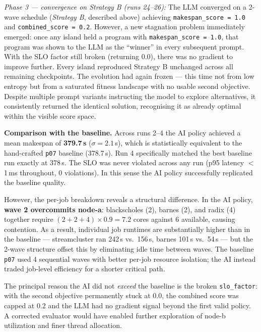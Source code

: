 \begin{enumerate}
\begin{enumerate}
\textit{Phase 3 --- convergence on Strategy B (runs 24--26):} The LLM converged on a 2-wave schedule (\emph{Strategy B}, described above) achieving \texttt{makespan\_score = 1.0} and \texttt{combined\_score = 0.2}. However, a new stagnation problem immediately emerged: once any island held a program with \texttt{makespan\_score = 1.0}, that program was shown to the LLM as the ``winner'' in every subsequent prompt. With the SLO factor still broken (returning 0.0), there was no gradient to improve further. Every island reproduced Strategy B unchanged across all remaining checkpoints. The evolution had again frozen --- this time not from low entropy but from a saturated fitness landscape with no usable second objective. Despite multiple prompt variants instructing the model to explore alternatives, it consistently returned the identical solution, recognising it as already optimal within the visible score space.

\medskip
\noindent\textbf{Comparison with the baseline.} \label{sec:ai_comparison}
Across runs 2--4 the AI policy achieved a mean makespan of \textbf{379.7\,s} ($\sigma = 2.1$\,s), which is statistically equivalent to the hand-crafted \texttt{p07} baseline (378.7\,s). Run 4 specifically matched the best baseline run exactly at 378\,s. The SLO was never violated across any run (p95 latency $<$ 1\,ms throughout, 0 violations). In this sense the AI policy successfully replicated the baseline quality.

However, the per-job breakdown reveals a structural difference. In the AI policy, \textbf{wave 2 overcommits node-a}: blackscholes (2), barnes (2), and radix (4) together require $(2+2+4)\times 0.9 = 7.2$ cores against 6 available, causing contention. As a result, individual job runtimes are substantially higher than in the baseline --- streamcluster ran 242\,s vs.\ 156\,s, barnes 101\,s vs.\ 54\,s --- but the 2-wave structure offset this by eliminating idle time between waves. The baseline \texttt{p07} used 4 sequential waves with better per-job resource isolation; the AI instead traded job-level efficiency for a shorter critical path.

The principal reason the AI did not \emph{exceed} the baseline is the broken \texttt{slo\_factor}: with the second objective permanently stuck at 0.0, the combined score was capped at 0.2 and the LLM had no gradient signal beyond the first valid policy. A corrected evaluator would have enabled further exploration of node-b utilization and finer thread allocation.


\end{enumerate}
\end{enumerate}
